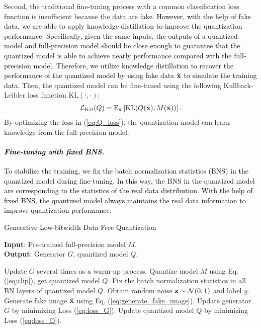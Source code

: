 \documentclass[runningheads]{llncs}
\def\KL{\text{KL}}
\def\kd{\mathrm{KD}}
\def\mL{{\mathcal L}}
\def\mN{{\mathcal N}}
\def\bx{{\bf x}}
\def\bz{{\bf z}}
\def\mmE{{\mathbb E}}
\def\bx{{\bf x}}
\def\bz{{\bf z}}
\def\mytitle{\textcolor{black}{Generative Low-bitwidth Data Free Quantization }}
\def\xsk{\textcolor{black}}
\def\jie{\textcolor{black}}
\def\wrong{\textcolor{black}}
\def\new{\textcolor{black}}
\begin{document}
Second, the traditional fine-tuning process with a common classification loss function is insufficient because the data are fake.
\jie{\new{However,} with the help of fake data, we are able to apply knowledge distillation \cite{hinton2015distilling} to improve the quantization performance.
Specifically, 
given the same inputs, the outputs of a quantized model and full-precision model should be close enough to guarantee that the quantized model is able to achieve nearly performance compared with the full-precision model.
Therefore, we utilize knowledge distillation to recover the performance of the quantized model by using fake data $\hat{\bx}$ to simulate the training data.
}
Then, the quantized model can be fine-tuned using the following Kullback-Leibler loss \new{function} $\KL(\cdot,\cdot)$:
\xsk{\begin{eqnarray}\label{eq:Q_loss}
\mL_\kd(Q)=\mmE_{\hat{\bx}}
    \left[\KL(Q({\hat{\bx}}), M({\hat{\bx}}))\right].
\end{eqnarray}}By optimizing \new{the loss in} (\ref{eq:Q_loss}), the quantization model can learn knowledge from the full-precision model.

\paragraph{\emph{\textbf{\xsk{Fine-tuning with fixed BNS.}}}}

\jie{
To stabilize the training, we fix the batch normalization statistics (BNS) in the quantized model during fine-tuning. In this way, the BNS in the quantized model \new{are} corresponding to the statistics of the real data distribution.
With the help of fixed BNS, the quantized model always maintains the real data information to improve quantization performance. 
}





\begin{algorithm}[t]
\caption{\mytitle}
\label{alg:alg1}
\textbf{Input}: Pre-trained full-precision model $M$.\\
\textbf{Output}: Generator $G$, quantized model $Q$.

 \begin{algorithmic}[l]
    \STATE \wrong{Update $G$ several times as a warm-up process.}
    \STATE Quantize model $M$ using Eq. (\ref{eq:clip}), get quantized model $Q$.
    \STATE Fix the batch normalization statistics in all BN layers of quantized model $Q$.
    \STATE Obtain random noise $\bz \sim \mN (0,1)$ and label $y$.
	\STATE Generate fake image $\hat{\bx}$ using Eq. (\ref{eq:generate_fake_image}).
	\STATE Update generator $G$ by minimizing Loss (\ref{eq:loss_G}).
	\STATE Update quantized model $Q$ by minimizing Loss (\ref{eq:loss_D}).
    \ENDFOR
	\end{algorithmic}
	\label{alg:AT}
\end{algorithm}
\end{document}
